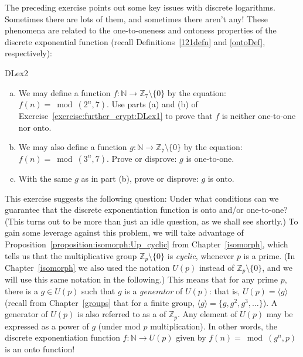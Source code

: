 The preceding exercise points out some key issues with discrete logarithms. Sometimes there are lots of them, and sometimes there aren't any! These phenomena are related to the one-to-oneness and ontoness properties of  the discrete exponential function (recall Definitions~\ref{121defn} and \ref{ontoDef}, respectively):

\begin{exercise}{DLex2}
\begin{enumerate}[(a)]
\item
We may define a function $f: \mathbb{N} \rightarrow \mathbb{Z}_7 \setminus \{0\}$ by the equation: $f(n) = \bmod(2^n,7)$. 
Use parts (a) and (b) of Exercise~\ref{exercise:further_crypt:DLex1} to prove that $f$ is neither one-to-one nor onto.
\item
We may also define a function $g: \mathbb{N} \rightarrow \mathbb{Z}_7 \setminus \{0\}$ by the equation: $f(n) = \bmod(3^n,7)$. 
Prove or disprove: $g$ is one-to-one.
\item
With the same $g$ as in part (b), prove or disprove: $g$ is onto.
\end{enumerate}
\end{exercise}

This exercise suggests the following question:  Under what conditions can we guarantee that the discrete exponentiation function is onto and/or one-to-one? (This turns out to be more than just an idle question, as we shall see shortly.)  To gain some leverage against this problem, we will take advantage of   Proposition~\ref{proposition:isomorph:Up_cyclic} from Chapter~\ref{isomorph}, which tells us that the multiplicative group $\mathbb{Z}_p\setminus \{0\}$ is \emph{cyclic}, whenever $p$ is a prime. (In Chapter~\ref{isomorph} we also used the notation $U(p)$ instead of $\mathbb{Z}_p\setminus \{0\}$, and we will use this same notation in the following.) This means that for any prime $p$, there is a $g \in U(p)$  such that $g$ is a \emph{generator} of  $U(p)$: that is, $U(p) = \langle g \rangle$ (recall from Chapter~\ref{groups} that for a finite group, $\langle g \rangle = \{g, g^2, g^3, \ldots \}$). A generator of $U(p)$ is also referred to as a  of $\mathbb{Z}_p$. Any element of $U(p)$ may be expressed as a power of $g$ (under mod $p$ multiplication).  In other words, the discrete exponentiation function $f: \mathbb{N} \rightarrow U(p)$ given by $f(n) = \bmod(g^n,p)$ is an onto function!  

